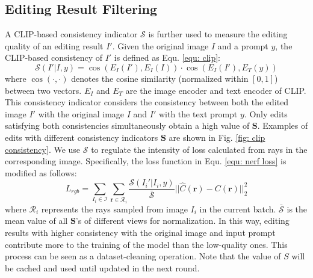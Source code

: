 \subsection{Editing Result Filtering}
\label{sec: Editing Result Filtering}
A CLIP-based consistency indicator $\mathcal{S}$ is further used to measure the editing quality of an editing result $I'$. Given the original image $I$ and a prompt $y$, the CLIP-based consistency of $I'$ is defined as Equ. \ref{equ: clip}:
\begin{equation}
    \mathcal{S}(I' | I, y) = \cos(E_{I}(I'), E_{I}(I)) \cdot \cos(E_{I}(I'), E_{T}(y))
    \label{equ: clip}
\end{equation}
where $\cos(\cdot, \cdot)$ denotes the cosine similarity (normalized within $[0, 1]$) between two vectors.
$E_{I}$ and $E_{T}$ are the image encoder and text encoder of CLIP.
This consistency indicator considers the consistency between both the edited image $I'$ with the original image $I$ and $I'$ with the text prompt $y$.
Only edits satisfying both consistencies simultaneously obtain a high value of $\mathbf{S}$.
Examples of edits with different consistency indicators $\mathbf{S}$ are shown in Fig. \ref{fig: clip consistency}.
We use $\mathcal{S}$ to regulate the intensity of loss calculated from rays in the corresponding image. Specifically, the loss function in Equ. \ref{equ: nerf loss} is modified as follows:
\begin{equation}
    L_{rgb} = \sum_{I_i \in \mathcal{I}}\sum_{\mathbf{r} \in \mathcal{R}_i}\frac{\mathcal{S}(I_i' | I_i, y)}{\bar{\mathcal{S}}}||\hat{C}(\mathbf{r}) - C(\mathbf{r})||^2_2
    \label{equ: nerf loss new}
\end{equation}
where $\mathcal{R}_i$ represents the rays sampled from image $I_i$ in the current batch. $\bar{\mathcal{S}}$ is the mean value of all $\mathbf{S}$'s of different views for normalization. In this way, editing results with higher consistency with the original image and input prompt contribute more to the training of the model than the low-quality ones. This process can be seen as a dataset-cleaning operation. Note that the value of $S$ will be cached and used until updated in the next round.

